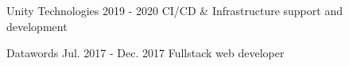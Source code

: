 \begin{cventries}
  \cventry
    {Unity Technologies} %
    {2019 - 2020} %
    {
        CI/CD \& Infrastructure support and development
    }
    

  \cventry
    {Datawords} %
    {Jul. 2017 - Dec. 2017} %
    {Fullstack web developer} %


\end{cventries}
